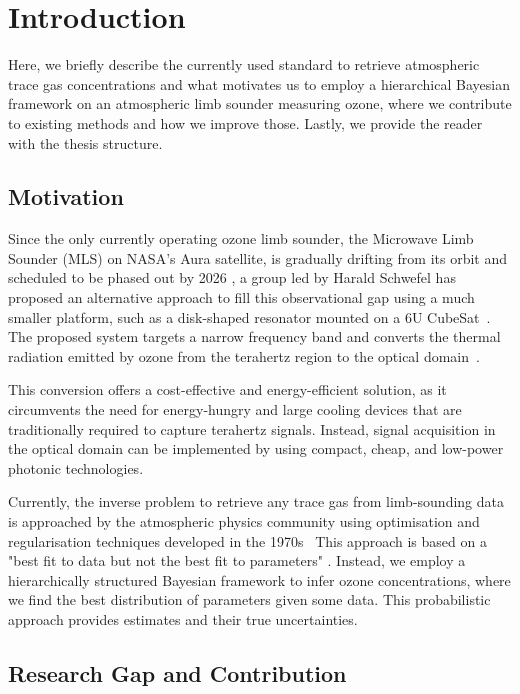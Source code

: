 \chapter{Introduction}
Here, we briefly describe the currently used standard to retrieve atmospheric trace gas concentrations and what motivates us to employ a hierarchical Bayesian framework on an atmospheric limb sounder measuring ozone, where we contribute to existing methods and how we improve those.
Lastly, we provide the reader with the thesis structure.

\section{Motivation}
Since the only currently operating ozone limb sounder, the Microwave Limb Sounder (MLS) on NASA's Aura satellite, is gradually drifting from its orbit and scheduled to be phased out by 2026 \cite{Bryan2024NASA}, a group led by Harald Schwefel has proposed an alternative approach to fill this observational gap using a much smaller platform, such as a disk-shaped resonator mounted on a 6U CubeSat~\cite{ustin2024current}. The proposed system targets a narrow frequency band and converts the thermal radiation emitted by ozone from the terahertz region to the optical domain~\cite{Suresh25,Sedlmeir14}. 

This conversion offers a cost-effective and energy-efficient solution, as it circumvents the need for energy-hungry and large cooling devices that are traditionally required to capture terahertz signals. Instead, signal acquisition in the optical domain can be implemented by using compact, cheap, and low-power photonic technologies.

Currently, the inverse problem to retrieve any trace gas from limb-sounding data is approached by the atmospheric physics community using optimisation and regularisation techniques developed in the 1970s~\cite{rodgers1976retrieval, NASA2022MLSv5}
This approach is based on a "best fit to data but not the best fit to parameters" \cite{tan2016LecNot}.
Instead, we employ a hierarchically structured Bayesian framework to infer ozone concentrations, where we find the best distribution of parameters given some data.
This probabilistic approach provides estimates and their true uncertainties.

\section{Research Gap and Contribution}

